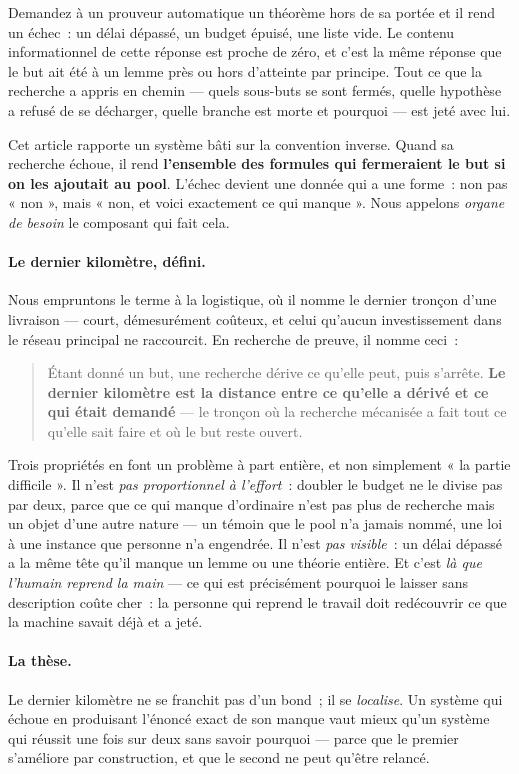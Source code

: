 \documentclass[11pt]{article}
\theoremstyle{remark}\newtheorem{remarque}{Remarque}
\begin{document}
Demandez à un prouveur automatique un théorème hors de sa portée et il rend un échec~:
un délai dépassé, un budget épuisé, une liste vide. Le contenu informationnel de cette
réponse est proche de zéro, et c'est la même réponse que le but ait été à un lemme près
ou hors d'atteinte par principe. Tout ce que la recherche a appris en chemin --- quels
sous-buts se sont fermés, quelle hypothèse a refusé de se décharger, quelle branche est
morte et pourquoi --- est jeté avec lui.

Cet article rapporte un système bâti sur la convention inverse. Quand sa recherche
échoue, il rend \textbf{l'ensemble des formules qui fermeraient le but si on les
ajoutait au pool}. L'échec devient une donnée qui a une forme~: non pas « non », mais
« non, et voici exactement ce qui manque ». Nous appelons \emph{organe de besoin} le
composant qui fait cela.

\paragraph{Le dernier kilomètre, défini.} Nous empruntons le terme à la logistique, où
il nomme le dernier tronçon d'une livraison --- court, démesurément coûteux, et celui
qu'aucun investissement dans le réseau principal ne raccourcit. En recherche de preuve,
il nomme ceci~:

\begin{quote}
Étant donné un but, une recherche dérive ce qu'elle peut, puis s'arrête. \textbf{Le
dernier kilomètre est la distance entre ce qu'elle a dérivé et ce qui était demandé} ---
le tronçon où la recherche mécanisée a fait tout ce qu'elle sait faire et où le but
reste ouvert.
\end{quote}

Trois propriétés en font un problème à part entière, et non simplement « la partie
difficile ». Il n'est \emph{pas proportionnel à l'effort}~: doubler le budget ne le
divise pas par deux, parce que ce qui manque d'ordinaire n'est pas plus de recherche
mais un objet d'une autre nature --- un témoin que le pool n'a jamais nommé, une loi à
une instance que personne n'a engendrée. Il n'est \emph{pas visible}~: un délai dépassé
a la même tête qu'il manque un lemme ou une théorie entière. Et c'est \emph{là que
l'humain reprend la main} --- ce qui est précisément pourquoi le laisser sans
description coûte cher~: la personne qui reprend le travail doit redécouvrir ce que la
machine savait déjà et a jeté.

\paragraph{La thèse.} Le dernier kilomètre ne se franchit pas d'un bond~; il se
\emph{localise}. Un système qui échoue en produisant l'énoncé exact de son manque vaut
mieux qu'un système qui réussit une fois sur deux sans savoir pourquoi --- parce que le
premier s'améliore par construction, et que le second ne peut qu'être relancé.
\end{document}
